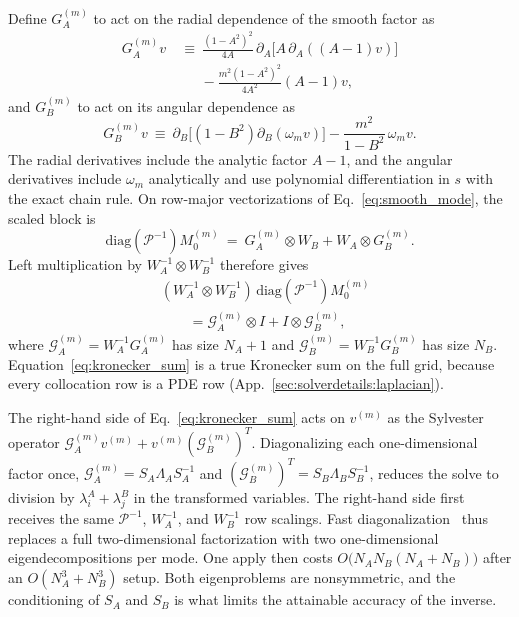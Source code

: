 \documentclass[
  aps,
  prd,
  twocolumn,
  10pt,
  amsmath,
  amssymb,
  nofootinbib,
  superscriptaddress,
  floatfix,
]{revtex4-2}
\begin{document}
Define $G_A^{(m)}$ to act on the radial dependence of the smooth factor as
\begin{equation}
\begin{aligned}
  G_A^{(m)}v \ &\equiv \ \frac{(1-A^2)^2}{4A}\,
  \partial_A\!\big[A\,\partial_A((A-1)v)\big] \\
  &\quad \ \ -\frac{m^2(1-A^2)^2}{4A^2}(A-1)v,
\end{aligned}
  \label{eq:sep_LA}
\end{equation}
and $G_B^{(m)}$ to act on its angular dependence as
\begin{equation}
  G_B^{(m)}v \ \equiv \ \partial_B\!\big[(1-B^2)\partial_B(\omega_m v)\big]
  -\frac{m^2}{1-B^2}\,\omega_m v.
  \label{eq:sep_LB}
\end{equation}
The radial derivatives include the analytic factor $A-1$, and the angular derivatives include $\omega_m$ analytically and use polynomial differentiation in $s$ with the exact chain rule.
On row-major vectorizations of Eq.~\eqref{eq:smooth_mode}, the scaled block is
\begin{equation}
  \mathrm{diag}(\mathcal{P}^{-1})M_0^{(m)}
  \ = \ G_A^{(m)}\otimes W_B + W_A\otimes G_B^{(m)}.
  \label{eq:sep_block}
\end{equation}
Left multiplication by $W_A^{-1}\otimes W_B^{-1}$ therefore gives
\begin{equation}
\begin{aligned}
  &(W_A^{-1}\otimes W_B^{-1})\,
    \mathrm{diag}(\mathcal{P}^{-1})M_0^{(m)} \\
  &\qquad = \mathcal{G}_A^{(m)}\otimes I
       + I\otimes\mathcal{G}_B^{(m)},
\end{aligned}
  \label{eq:kronecker_sum}
\end{equation}
where $\mathcal{G}_A^{(m)}=W_A^{-1}G_A^{(m)}$ has size $N_A{+}1$ and
$\mathcal{G}_B^{(m)}=W_B^{-1}G_B^{(m)}$ has size $N_B$.
Equation~\eqref{eq:kronecker_sum} is a true Kronecker sum on the full grid, because every collocation row is a PDE row (App.~\ref{sec:solverdetails:laplacian}).

The right-hand side of Eq.~\eqref{eq:kronecker_sum} acts on $v^{(m)}$ as the Sylvester operator
$\mathcal{G}_A^{(m)}v^{(m)}+v^{(m)}(\mathcal{G}_B^{(m)})^T$.
Diagonalizing each one-dimensional factor once,
$\mathcal{G}_A^{(m)}=S_A\Lambda_AS_A^{-1}$ and
$(\mathcal{G}_B^{(m)})^T=S_B\Lambda_BS_B^{-1}$, reduces the solve to division by $\lambda^A_i+\lambda^B_j$ in the transformed variables.
The right-hand side first receives the same $\mathcal{P}^{-1}$, $W_A^{-1}$, and $W_B^{-1}$ row scalings.
Fast diagonalization~\cite{Lynch1964} thus replaces a full two-dimensional factorization with two one-dimensional eigendecompositions per mode.
One apply then costs
$O\big(N_AN_B(N_A{+}N_B)\big)$ after an $O(N_A^3+N_B^3)$ setup. Both eigenproblems
are nonsymmetric, and the conditioning of $S_A$ and $S_B$ is what limits the
attainable accuracy of the inverse.
\end{document}
